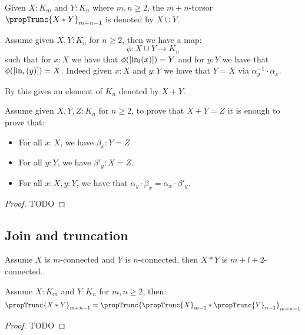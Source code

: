 \begin{definition}
Given $X:K_{m}$ and $Y:K_{n}$ where $m,n\geq 2$, the $m+n$-torsor $\propTrunc{X*Y}_{m+n-1}$ is denoted by $X\cup Y$.
\end{definition}

\begin{definition}
Assume given $X,Y:K_n$ for $n\geq 2$, then we have a map:
\[\phi : X\cup Y \to K_n\]
such that for $x:X$ we have that $\phi([\mathrm{in}_l(x)]) = Y$ and  for $y:Y$ we have that $\phi([\mathrm{in}_r(y)]) = X$. Indeed given $x:X$ and $y:Y$ we have that $Y = X$ via $\alpha_y^{-1}\cdot \alpha_x$. 

 By  this gives an element of $K_n$ denoted by $X+Y$.
\end{definition}

\begin{lemma}\label{equality-sum-torsor}
Assume given $X,Y,Z:K_{n}$ for $n\geq 2$, to prove that $X+Y=Z$ it is enough to prove that:
\begin{itemize}
\item For all $x:X$, we have $\beta_x: Y=Z$.
\item For all $y:Y$, we have $\beta'_y: X=Z$.
\item For all $x:X,y:Y$, we have that $\alpha_y\cdot \beta_x = \alpha_x\cdot\beta'_y$.
\end{itemize}
\end{lemma}

\begin{proof}
TODO
\end{proof}


\subsection{Join and truncation}

\begin{lemma}
Assume $X$ is $m$-connected and $Y$ is $n$-connected, then $X*Y$ is $m+l+2$-connected.
\end{lemma}

\begin{lemma}\label{truncation-and-join}
Assume $X:K_m$ and $Y:K_n$ for $m,n\geq 2$, then:
\[\propTrunc{X*Y}_{m+n-1} = \propTrunc{\propTrunc{X}_{m-1}*\propTrunc{Y}_{n-1}}_{m+n-1}\]
\end{lemma}

\begin{proof}
TODO
\end{proof}


